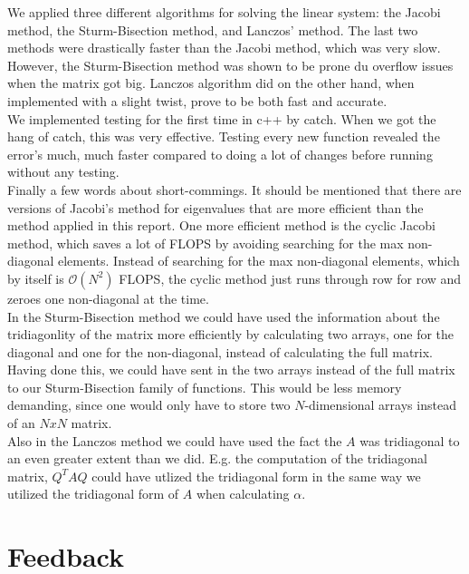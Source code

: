\documentclass{article}
\begin{document}
We applied three different algorithms for solving the linear system: the Jacobi method, the Sturm-Bisection method, and Lanczos' method. The last two methods were drastically faster than the Jacobi method, which was very slow. However, the Sturm-Bisection method was shown to be prone du overflow issues when the matrix got big. Lanczos algorithm did on the other hand, when implemented with a slight twist, prove to be both fast and accurate. \\

We implemented testing for the first time in c++ by catch. When we got the hang of catch, this was very effective. Testing every new function revealed the error's much, much faster compared to doing a lot of changes before running without any testing.\\

Finally a few words about short-commings. It should be mentioned that there are versions of Jacobi's method for eigenvalues that are more efficient than the method applied in this report. One more efficient method is the cyclic Jacobi method, which saves a lot of FLOPS by avoiding searching for the max non-diagonal elements. Instead of searching for the max non-diagonal elements, which by itself is $\mathcal{O}(N^2)$ FLOPS, the cyclic method just runs through row for row and zeroes one non-diagonal at the time.\\

In the Sturm-Bisection method we could have used the information about the tridiagonlity of the matrix more efficiently by calculating two arrays, one for the diagonal and one for the non-diagonal, instead of calculating the full matrix. Having done this, we could have sent in the two arrays instead of the full matrix to our Sturm-Bisection family of functions. This would be less memory demanding, since one would only have to store two $N$-dimensional arrays instead of an $N x N$ matrix.\\

Also in the Lanczos method we could have used the fact the $A$ was tridiagonal to an even greater extent than we did. E.g. the computation of the tridiagonal matrix, $Q^TAQ$ could have utlized the tridiagonal form in the same way we utilized the tridiagonal form of $A$ when calculating $\alpha$.





\section{Feedback}
\end{document}
